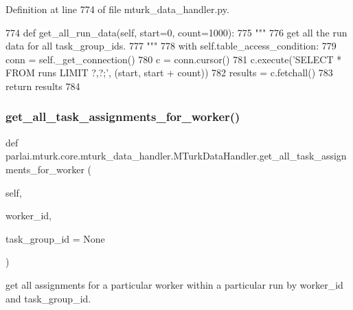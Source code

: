 Definition at line 774 of file mturk\+\_\+data\+\_\+handler.\+py.


\begin{DoxyCode}
774     \textcolor{keyword}{def }get\_all\_run\_data(self, start=0, count=1000):
775         \textcolor{stringliteral}{"""}
776 \textcolor{stringliteral}{        get all the run data for all task\_group\_ids.}
777 \textcolor{stringliteral}{        """}
778         with self.table\_access\_condition:
779             conn = self.\_get\_connection()
780             c = conn.cursor()
781             c.execute(\textcolor{stringliteral}{'SELECT * FROM runs LIMIT ?,?;'}, (start, start + count))
782             results = c.fetchall()
783             \textcolor{keywordflow}{return} results
784 
\end{DoxyCode}
\mbox{\label{classparlai_1_1mturk_1_1core_1_1mturk__data__handler_1_1MTurkDataHandler_a6ad4b37c9393559d29d7e0e7a1b93027}} 
\subsubsection{\texorpdfstring{get\+\_\+all\+\_\+task\+\_\+assignments\+\_\+for\+\_\+worker()}{get\_all\_task\_assignments\_for\_worker()}}
{\footnotesize\ttfamily def parlai.\+mturk.\+core.\+mturk\+\_\+data\+\_\+handler.\+M\+Turk\+Data\+Handler.\+get\+\_\+all\+\_\+task\+\_\+assignments\+\_\+for\+\_\+worker (\begin{DoxyParamCaption}\item[{}]{self,  }\item[{}]{worker\+\_\+id,  }\item[{}]{task\+\_\+group\+\_\+id = {\ttfamily None} }\end{DoxyParamCaption})}

\begin{DoxyVerb}get all assignments for a particular worker within a particular run by worker_id
and task_group_id.
\end{DoxyVerb}
 


